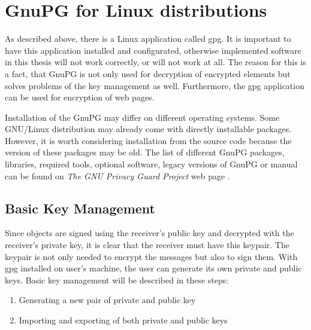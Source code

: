 \section{GnuPG for Linux distributions}
As described above, there is a Linux application called gpg. It is important to have this application installed and configurated, otherwise implemented software in this thesis will not work correctly, or will not work at all. The reason for this is a fact, that GnuPG is not only used for decryption of encrypted elements but solves problems of the key management as well. Furthermore, the gpg application can be used for encryption of web pages.

Installation of the GnuPG may differ on different operating systems. Some GNU/Linux distribution may already come with directly installable packages. However, it is worth considering installation from the source code because the version of these packages may be old. The list of different GnuPG packages, libraries, required tools, optional software, legacy versions of GnuPG or manual can be found on \textit{The GNU Privacy Guard Project} web page \cite{GnuPG}.

\subsection{Basic Key Management}
Since objects are signed using the receiver's public key and decrypted with the receiver's private key, it is clear that the receiver must have this keypair. The keypair is not only needed to encrypt the messages but also to sign them. With gpg installed on user's machine, the user can generate its own private and public keys. Basic key management will be described in these steps:
\begin{enumerate}
    \item Generating a new pair of private and public key
    \item Importing and exporting of both private and public keys
\end{enumerate}

